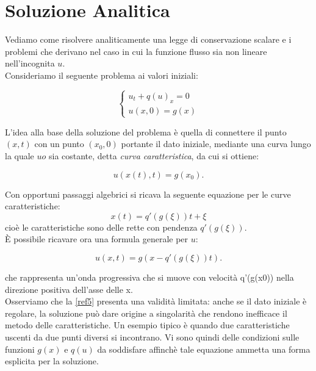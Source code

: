 \section{Soluzione Analitica}
Vediamo come risolvere analiticamente una legge di conservazione scalare e i problemi che derivano nel caso in cui la funzione flusso sia non lineare nell'incognita $u$.\\
\noindent Consideriamo il seguente problema ai valori iniziali:
\begin{center}
\begin{equation}
\begin{cases}
u_t +q(u)_x = 0 \\
u(x,0) = g(x)
\end{cases}
\label{ref3}
\end{equation}
\end{center}
\noindent L'idea alla base della soluzione del problema è quella di connettere il punto $(x,t)$ con un punto $(x_0,0)$ portante il dato iniziale, mediante una curva lungo la quale $uo$ sia costante, detta  \textit{curva caratteristica}, da cui si ottiene:
\begin{center}
\begin{equation}
u(x(t), t) = g(x_0).
\label{ref4}
\end{equation}
\end{center}
\noindent Con opportuni passaggi algebrici si ricava la seguente equazione per le curve caratteristiche:
$$ x(t) = q'(g(\xi))t + \xi $$
\noindent cioè le caratteristiche sono delle rette con pendenza $q'(g(\xi))$. \\
\noindent È possibile ricavare ora una formula generale per $u$:
\begin{center}
\begin{equation}
u(x, t) = g(x-q'(g(\xi))t).
\label{ref5}
\end{equation}
\end{center}
\noindent che rappresenta un'onda progressiva che si muove con velocità q'(g(x0)) nella direzione positiva dell'asse delle x. \\
\noindent Osserviamo che la \ref{ref5} presenta una validità limitata: anche se il dato iniziale è regolare, la soluzione può dare origine a singolarità che rendono inefficace il metodo delle caratteristiche. Un esempio tipico è quando due caratteristiche uscenti da due punti diversi si incontrano. Vi sono quindi delle condizioni sulle funzioni $g(x)$ e $q(u)$ da soddisfare affinchè tale equazione ammetta una forma esplicita per la soluzione. \\
